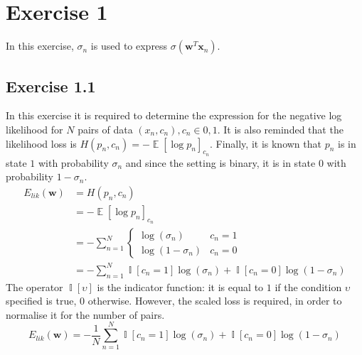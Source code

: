 \documentclass[fleqn]{report}
\renewcommand{\vec}[1]{\mathbf{#1}}
\DeclareMathOperator{\E}{\mathbb{E}}
\DeclareMathOperator{\I}{\mathbb{I}}
\begin{document}
\section*{Exercise 1}
In this exercise, $\sigma_n$ is used to express $\sigma \left( \vec{w}^T \vec{x}_n \right )$.

\subsection*{Exercise 1.1}
In this exercise it is required to determine the expression for the negative log likelihood for $N$ pairs of data $(x_n, c_n), c_n \in {0, 1}$. It is also reminded that the likelihood loss is $H(p_n, c_n) = - \E[\log p_n]_{c_n}$. Finally, it is known that $p_n$ is in state $1$ with probability $\sigma_n$ and since the setting is binary, it is in state $0$ with probability $1 - \sigma_n$.
\begin{equation}
    \begin{split}
        E_{lik}(\vec{w}) & = H(p_n, c_n) \\
        & = - \E[\log p_n]_{c_n} \\
        & = - \sum_{n=1}^N
        \begin{cases}
            \log \left( \sigma_n \right) & c_n = 1 \\
            \log \left(1 - \sigma_n \right) & c_n = 0
        \end{cases}
        \\ & = - \sum_{n=1}^N \I[c_n = 1] \log (\sigma_n) + \I[c_n = 0] \log (1 - \sigma_n)
    \end{split}
\end{equation}
The operator $\I[\upsilon]$ is the indicator function: it is equal to $1$ if the condition $\upsilon$ specified is true, $0$ otherwise. However, the scaled loss is required, in order to normalise it for the number of pairs.
\begin{equation}
    E_{lik}(\vec{w}) = - \frac{1}{N} \sum_{n=1}^N \I[c_n = 1] \log (\sigma_n) + \I[c_n = 0] \log (1 - \sigma_n)
\end{equation}
\end{document}
